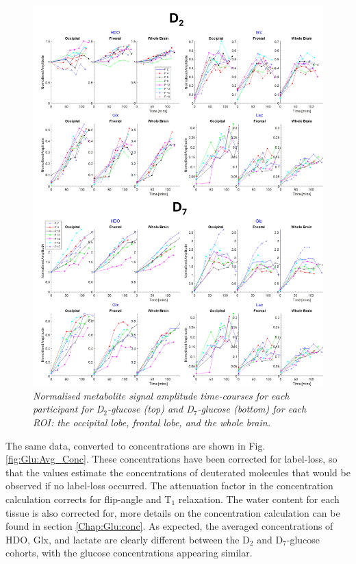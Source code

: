 \begin{figure}
    \centering
    \includegraphics[width = 1\textwidth]{Figures/Glucose/Ind_Amp.png}
    \caption{\textit{Normalised metabolite signal amplitude time-courses for each participant for D$_2$-glucose (top) and D$_7$-glucose (bottom) for each \ac{ROI}: the occipital lobe, frontal lobe, and the whole brain.}}
    \label{fig:Glu:Ind_Amp}
\end{figure}

The same data, converted to concentrations are shown in Fig. \ref{fig:Glu:Avg_Conc}. These concentrations have been corrected for label-loss, so that the values estimate the concentrations of deuterated molecules that would be observed if no label-loss occurred. The attenuation factor in the concentration calculation corrects for flip-angle and T$_1$ relaxation. The water content for each tissue is also corrected for, more details on the concentration calculation can be found in section \ref{Chap:Glu:conc}. As expected, the averaged concentrations of \ac{HDO}, Glx, and lactate are clearly different between the D$_2$ and D$_7$-glucose cohorts, with the glucose concentrations appearing similar. 

